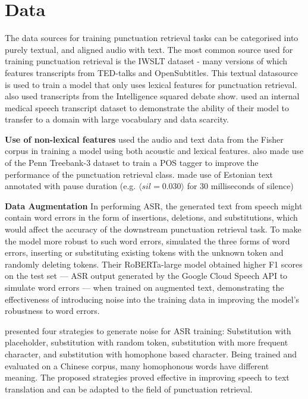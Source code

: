 \documentclass[a4paper]{article}
\begin{document}
\section{Data}
The data sources for training punctuation retrieval tasks can be categorised into purely textual, and aligned audio with text.
The most common source used for training punctuation retrieval is the IWSLT dataset - many versions of which features transcripts from TED-talks and OpenSubtitles. This textual datasource is used to train a model that only uses lexical features for punctuation retrieval. \cite{jointlearningcorrbirnn} also used transcripts from the Intelligence squared debate show. \cite{medicalasr} used an internal medical speech transcript dataset to demonstrate the ability of their model to transfer to a domain with large vocabulary and data scarcity.

\textbf{Use of non-lexical features} \cite{multimodalsemi} used the audio and text data from the Fisher corpus in training a model using both acoustic and lexical features. \cite{adversarial} also made use of the Penn Treebank-3 dataset to train a POS tagger to improve the performance of the punctuation retrieval class. \cite{birnnattention} made use of Estonian text annotated with pause duration (e.g. $\langle sil=0.030\rangle$ for 30 milliseconds of silence) 

\textbf{Data Augmentation} In performing ASR, the generated text from speech might contain word errors in the form of insertions, deletions, and substitutions, which would affect the accuracy of the downstream punctuation retrieval task. To make the model more robust to such word errors, \cite{noisy} simulated the three forms of word errors, inserting or substituting existing tokens with the unknown token and randomly deleting tokens. Their RoBERTa-large model obtained higher F1 scores on the test set --- ASR output generated by the Google Cloud Speech API to simulate word errors --- when trained on augmented text, demonstrating the effectiveness of introducing noise into the training data in improving the model's robustness to word errors. 

\cite{speechtranslationrobust} presented four strategies to generate noise for ASR training: Substitution with placeholder, substitution with random token, substitution with more frequent character, and substitution with homophone based character. Being trained and evaluated on a Chinese corpus, many homophonous words have different meaning. The proposed strategies proved effective in improving speech to text translation and can be adapted to the field of punctuation retrieval.
\end{document}
